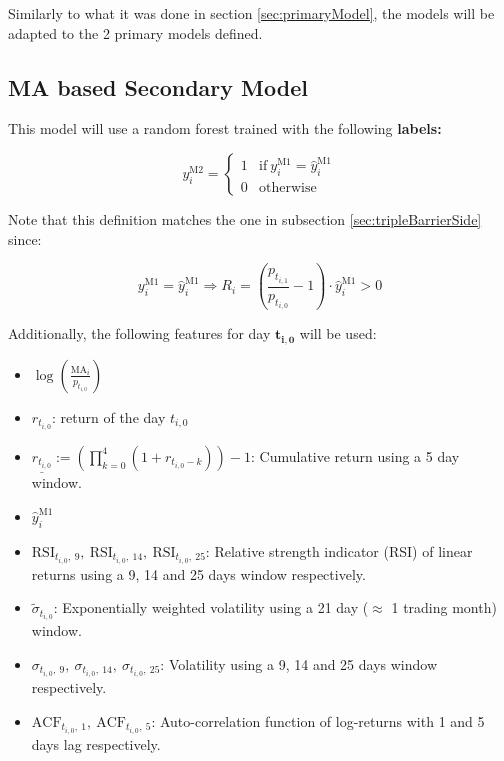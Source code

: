 \documentclass[a4paper]{report}
\begin{document}
Similarly to what it was done in section \ref{sec:primaryModel}, the models 
will be adapted to the 2 primary models defined.

\subsection{MA based Secondary Model}
\label{sec:MASecondaryModel}
This model will use a random forest trained with the following
\textbf{labels:}

\begin{equation*}
	y^{\text{M2}}_i =
	\begin{cases}
	1 & \text{if}\ y^{\text{M1}}_i = \widehat{y}^{\text{M1}}_i\\
	0 & \text{otherwise}
	\end{cases}
\end{equation*}

Note that this definition matches the one in subsection 
\ref{sec:tripleBarrierSide} since:

\begin{equation*}
	y^{\text{M1}}_i = \widehat{y}^{\text{M1}}_i \Rightarrow 
	R_i	= \left( \frac{p_{t_{i,1}}}{p_{t_{i,0}}} - 1 \right) \cdot 
	\widehat{y}^{\text{M1}}_i > 0
\end{equation*}

Additionally, the following features for day $\boldsymbol{t_{i,0}}$ 
will be used:
\begin{itemize}	
	\item $\log \left( \frac{\text{MA}_{i}}{p_{t_{i,0}}} 
	\right)$
	
	\item $r_{t_{i,0}}$: return of the day $t_{i,0}$
	
	\item $\underline{r_{t_{i,0}}} := \left( \prod_{k=0}^{4} 
	(1 + r_{t_{i,0}-k}) 	\right) - 1$: Cumulative return using a 5 day 
	window.
	
	\item $\widehat{y}_{i}^{\text{M1}}$

	\item $\text{RSI}_{t_{i,0},\ 9},\ 
	\text{RSI}_{t_{i,0},\ 14},\ 
	\text{RSI}_{t_{i,0},\ 25}$:
	Relative strength indicator (RSI) of linear returns using a 9, 14 
	and 25 days window respectively.
	
	\item $\tilde{\sigma}_{t_{i,0}}$: Exponentially weighted 
	volatility using a 21 day ($\approx$ 1 trading month) window.
	
	\item $\sigma_{t_{i,0},\ 9},\ \sigma_{t_{i,0},\ 14},\ 
	\sigma_{t_{i,0},\ 25}$: Volatility using a 9, 14 and 25 days window 
	respectively.
	
	\item $\text{ACF}_{t_{i,0},\ 1},\ \text{ACF}_{t_{i,0},\ 5}$: 
	Auto-correlation function of log-returns with 1 and 5 days lag 
	respectively.
\end{itemize}
\end{document}
